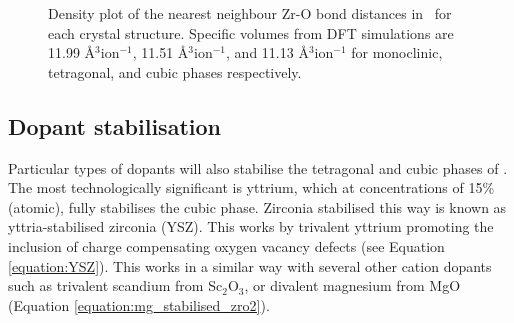 


\begin{figure}
\begin{center}
		\caption{Density plot of the nearest neighbour Zr-O bond distances in \zirconia\ for each crystal structure. Specific volumes from DFT simulations are 11.99 \r{A}$^{3}$ion$^{-1}$, 11.51 \r{A}$^{3}$ion$^{-1}$, and 11.13 \r{A}$^{3}$ion$^{-1}$ for monoclinic, tetragonal, and cubic phases respectively.}
		\label{figure:zrobonddistance}
	\end{center}
\end{figure}




\subsection{Dopant stabilisation}

Particular types of dopants will also stabilise the tetragonal and cubic phases of \zirconia. The most technologically significant is yttrium, which at concentrations of 15\% (atomic), fully stabilises the cubic phase. Zirconia stabilised this way is known as yttria-stabilised zirconia (YSZ). This works by trivalent yttrium promoting the inclusion of charge compensating oxygen vacancy defects (see Equation \ref{equation:YSZ}). This works in a similar way with several other cation dopants such as trivalent scandium from Sc$_{2}$O$_{3}$, or divalent magnesium from MgO (Equation \ref{equation:mg_stabilised_zro2}).

